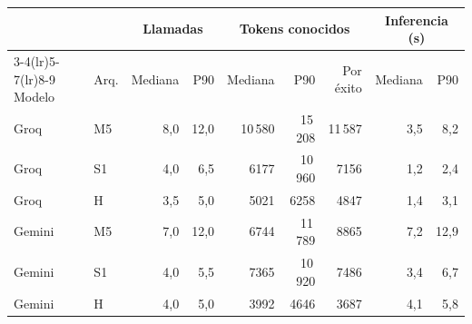 \begin{tabular}{llrrrrrrr}\toprule
& & \multicolumn{2}{c}{Llamadas} & \multicolumn{3}{c}{Tokens conocidos} & \multicolumn{2}{c}{Inferencia (s)} \\
\cmidrule(lr){3-4}\cmidrule(lr){5-7}\cmidrule(lr){8-9}
Modelo & Arq. & Mediana & P90 & Mediana & P90 & Por éxito & Mediana & P90 \\ \midrule
Groq & M5 & 8,0 & 12,0 & 10\,580 & 15\,208 & 11\,587 & 3,5 & 8,2 \\
Groq & S1 & 4,0 & 6,5 & 6177 & 10\,960 & 7156 & 1,2 & 2,4 \\
Groq & H & 3,5 & 5,0 & 5021 & 6258 & 4847 & 1,4 & 3,1 \\
Gemini & M5 & 7,0 & 12,0 & 6744 & 11\,789 & 8865 & 7,2 & 12,9 \\
Gemini & S1 & 4,0 & 5,5 & 7365 & 10\,920 & 7486 & 3,4 & 6,7 \\
Gemini & H & 4,0 & 5,0 & 3992 & 4646 & 3687 & 4,1 & 5,8 \\
\bottomrule\end{tabular}
